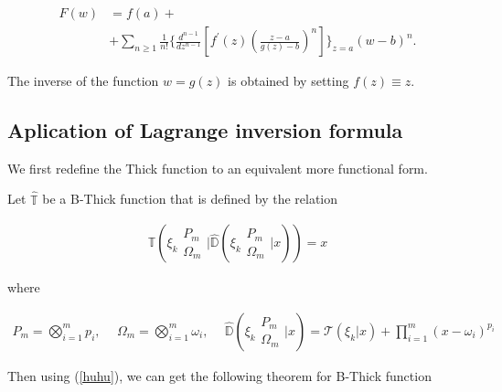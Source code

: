 \begin{align}
        F(w) &= f(a) + \\
        &+\sum_{n\geq1} \frac{1}{n!} \{\frac{d^{n-1}}{dz^{n-1}}\left[ f^{′}(z) 
        \left( \frac{z-a}{g(z) - b}\right)^n\right]\}_{z=a} (w-b)^n.
\label{huhu}
\end{align}

The inverse of the function \(w=g(z)\) is obtained by setting \(f(z)\equiv z\).
\subsection{Aplication of Lagrange inversion formula}
We first redefine the Thick function to an equivalent more functional form. 

\begin{definition}
        Let  \(\hat{\mathbb{T}}\) be a B-Thick function that is defined by the relation
        
        \begin{align}
        \hat{\mathbb{T}}\left( \xi_k \begin{matrix} P_m \\ \Omega_m \end{matrix} 
        \bigg| \hat{\mathbb{D}}\left( \xi_k \begin{matrix} P_m \\ \Omega_m \end{matrix}
        \bigg| x \right)  \right) =x
        \end{align}
        
        where
        
        \begin{align}
        P_m = \bigotimes_{i=1}^m p_i,  \ & \ \Omega_m = \bigotimes_{i=1}^m \omega_i, \
        & \ \hat{\mathbb{D}}\left( \xi_k \begin{matrix} P_m \\ \Omega_m \end{matrix} 
        \bigg| x \right) = \mathcal{T}(\xi_k | x) + \prod_{i=1}^m (x - \omega_i)^{p_i}
        \end{align}
\end{definition}

Then using (\ref{huhu}), we can get the following theorem for B-Thick function

